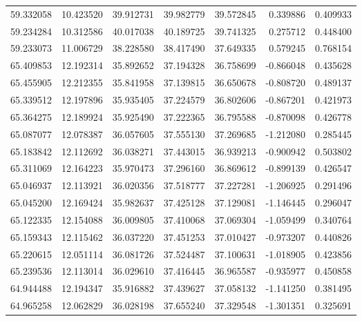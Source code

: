\begin{tabular}{rrrrrrr}
 59.332058 &  10.423520 &         39.912731 &         39.982779 &         39.572845 &  0.339886 &  0.409933 \\
 59.234284 &  10.312586 &         40.017038 &         40.189725 &         39.741325 &  0.275712 &  0.448400 \\
 59.233073 &  11.006729 &         38.228580 &         38.417490 &         37.649335 &  0.579245 &  0.768154 \\
 65.409853 &  12.192314 &         35.892652 &         37.194328 &         36.758699 & -0.866048 &  0.435628 \\
 65.455905 &  12.212355 &         35.841958 &         37.139815 &         36.650678 & -0.808720 &  0.489137 \\
 65.339512 &  12.197896 &         35.935405 &         37.224579 &         36.802606 & -0.867201 &  0.421973 \\
 65.364275 &  12.189924 &         35.925490 &         37.222365 &         36.795588 & -0.870098 &  0.426778 \\
 65.087077 &  12.078387 &         36.057605 &         37.555130 &         37.269685 & -1.212080 &  0.285445 \\
 65.183842 &  12.112692 &         36.038271 &         37.443015 &         36.939213 & -0.900942 &  0.503802 \\
 65.311069 &  12.164223 &         35.970473 &         37.296160 &         36.869612 & -0.899139 &  0.426547 \\
 65.046937 &  12.113921 &         36.020356 &         37.518777 &         37.227281 & -1.206925 &  0.291496 \\
 65.045200 &  12.169424 &         35.982637 &         37.425128 &         37.129081 & -1.146445 &  0.296047 \\
 65.122335 &  12.154088 &         36.009805 &         37.410068 &         37.069304 & -1.059499 &  0.340764 \\
 65.159343 &  12.115462 &         36.037220 &         37.451253 &         37.010427 & -0.973207 &  0.440826 \\
 65.220615 &  12.051114 &         36.081726 &         37.524487 &         37.100631 & -1.018905 &  0.423856 \\
 65.239536 &  12.113014 &         36.029610 &         37.416445 &         36.965587 & -0.935977 &  0.450858 \\
 64.944488 &  12.194347 &         35.916882 &         37.439627 &         37.058132 & -1.141250 &  0.381495 \\
 64.965258 &  12.062829 &         36.028198 &         37.655240 &         37.329548 & -1.301351 &  0.325691 \\

\end{tabular}
